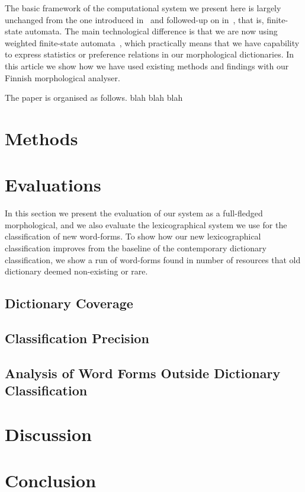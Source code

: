 \documentclass[a4paper,12pt]{article}
\begin{document}
The basic framework of the computational system we present here is largely
unchanged from the one introduced in~\cite{koskenniemi1983twolevel} and
followed-up on in~\cite{pirinen2008}, that is, finite-state automata. The main
technological difference is that we are now using weighted finite-state 
automata~\cite{openfst}, which practically means that we have capability to
express statistics or preference relations in our morphological dictionaries.
In this article we show how we have used existing methods and findings with
our Finnish morphological analyser.

The paper is organised as follows. blah blah blah

\section{Methods}

\section{Evaluations}

In this section we present the evaluation of our system as a full-fledged
morphological, and we also evaluate the lexicographical system we use for
the classification of new word-forms. To show how our new lexicographical
classification improves from the baseline of the contemporary dictionary
classification, we show a run of word-forms found in number of resources that
old dictionary deemed non-existing or rare.

\subsection{Dictionary Coverage}


\subsection{Classification Precision}


\subsection{Analysis of Word Forms Outside Dictionary Classification}


\section{Discussion}


\section{Conclusion}





\end{document}
